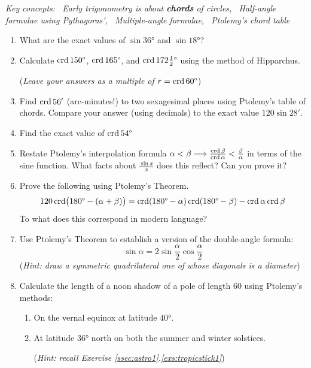 \begin{exercises}{}{}
	\hangindent\leftmargini\emph{Key concepts: \ Early trigonometry is about \textbf{chords} of circles, \ Half-angle formulae using Pythagoras', \ Multiple-angle formulae, \ Ptolemy's chord table}
	
	\begin{enumerate}
	  \item What are the exact values of $\sin\ang{36}$ and $\sin\ang{18}$?
	  
		\item %
		Calculate $\crd\ang{150}$, $\crd\ang{165}$, and $\crd\ang{172\tfrac 12}$ using the method of Hipparchus.\par
		(\emph{Leave your answers as a multiple of $r=\crd\ang{60}$})


	  \item Find $\crd 56'$ (arc-minutes!) to two sexagesimal places using Ptolemy's table of chords. Compare your answer (using decimals) to the exact value $120\sin 28'$.
	  
	  
	  \item Find the exact value of $\crd \ang{54}$
	 

	  \item Restate Ptolemy's interpolation formula $\alpha<\beta\Longrightarrow \frac{\crd\beta}{\crd\alpha}<\frac\beta\alpha$ in terms of the sine function. What facts about $\frac{\sin x}x$ does this reflect? Can you prove it?
	  
	  
	  \item%
	  Prove the following using Ptolemy's Theorem.
	  \[
	  	120\crd\bigl(\ang{180} -(\alpha+\beta)\bigr) 
	  	=\crd(\ang{180}-\alpha)\crd(\ang{180}-\beta) -\crd\alpha\crd\beta
	  \]
	  To what does this correspond in modern language?
	  
	  
	  \item Use Ptolemy's Theorem to establish a version of the double-angle formula:
	  \[
	  	\sin \alpha=2\sin\frac\alpha 2\cos\frac\alpha 2
	  \]
	  (\emph{Hint: draw a symmetric quadrilateral one of whose diagonals is a diameter})
	  
	  
	  \item%
	  Calculate the length of a noon shadow of a pole of length 60 using Ptolemy's methods:
	  \begin{enumerate}
	    \item On the vernal equinox at latitude $\ang{40}$.
	  	\item%
	  	At latitude \ang{36} north on both the summer and winter solstices.\par
	  	(\emph{Hint: recall Exercise \ref*{ssec:astro1}.\ref{exs:tropicstick1}})
	  \end{enumerate}
	  
	\end{enumerate}
\end{exercises}